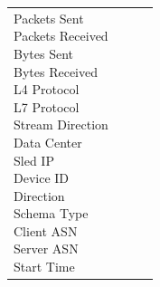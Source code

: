 \begin{description}
\begin{longtable}{p{}|p{}|p{}|p{}}
{                                                                                                                            Packets Sent\\
                                                                                                                            Packets Received\\
                                                                                                                            Bytes Sent\\
                                                                                                                            Bytes Received\\
                                                                                                                            L4 Protocol\\
                                                                                                                            L7 Protocol\\
                                                                                                                            Stream Direction\\
                                                                                                                            Data Center\\
                                                                                                                            Sled IP\\
                                                                                                                            Device ID\\
                                                                                                                            Direction\\
                                                                                                                            Schema Type\\
                                                                                                                            Client ASN\\
                                                                                                                            Server ASN\\
                                                                                                                            Start Time\\
}
\end{longtable}
\end{description}
